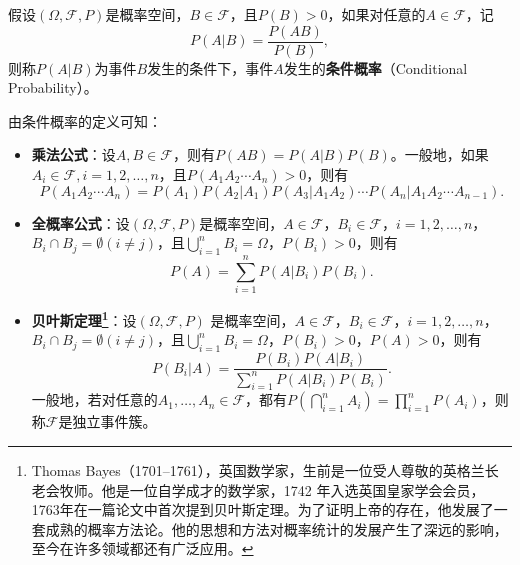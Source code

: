 \begin{definition}[条件概率]
假设$(\Omega,\mathscr F, P)$是概率空间，$B\in \mathscr F$，且$P(B)>0$，如果对任意的$A\in \mathscr F$，记
\[
    P(A|B) = \frac{P(AB)}{P(B)},
\]
则称$P(A|B)$为事件$B$发生的条件下，事件$A$发生的\textbf{条件概率}（Conditional Probability）。
\end{definition}
由条件概率的定义可知：
\begin{itemize}
  \item \textbf{乘法公式}：设$A,B\in \mathscr F$，则有$P(AB)=P(A|B)P(B)$。一般地，如果$A_i\in \mathscr F, i=1,2,\ldots,n$，且$P(A_1 A_2\cdots A_n)>0$，则有\[P(A_1 A_2\cdots A_n)=P(A_1)P(A_2|A_1)P(A_3|A_1A_2)\cdots P(A_n|A_1A_2\cdots A_{n-1}).\]
  \item \textbf{全概率公式}：设$(\Omega,\mathscr F, P)$是概率空间，$A\in \mathscr F$，$B_i\in \mathscr F$，$i = 1,2,\ldots,n$，$B_i\cap B_j=\emptyset (i\ne j)$，且$\bigcup\limits_{i=1}^n B_i = \Omega$，$P(B_i)>0$，则有
      \[
        P(A) = \sum\limits_{i=1}^n P(A|B_i) P(B_i).
      \]
  \item \textbf{贝叶斯定理\footnote{Thomas Bayes（1701--1761），英国数学家，生前是一位受人尊敬的英格兰长老会牧师。他是一位自学成才的数学家，1742 年入选英国皇家学会会员，1763年在一篇论文中首次提到贝叶斯定理。为了证明上帝的存在，他发展了一套成熟的概率方法论。他的思想和方法对概率统计的发展产生了深远的影响，至今在许多领域都还有广泛应用。}}：设$(\Omega,\mathscr F, P)$ 是概率空间，$A\in \mathscr F$，$B_i\in \mathscr F$，$i = 1,2,\ldots,n$，$B_i\cap B_j=\emptyset (i\ne j)$，且$\bigcup\limits_{i=1}^n B_i = \Omega$，$P(B_i)>0$，$P(A)>0$，则有
      \[
        P(B_i|A) = \frac{P(B_i)P(A|B_i)}{\sum\limits_{i=1}^n P(A|B_i) P(B_i)}.
      \]
      一般地，若对任意的$A_1,\ldots,A_n\in \mathscr F$，都有$P(\bigcap\limits_{i=1}^n A_i) =\prod\limits_{i=1}^n P(A_i)$，则称$\mathscr F$是独立事件簇。
\end{itemize}

